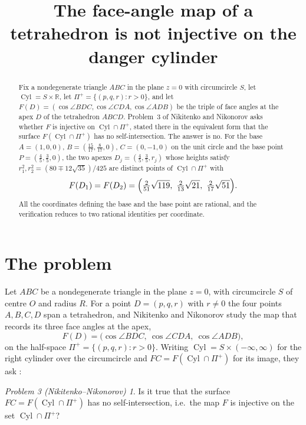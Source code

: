 \documentclass[11pt]{amsart}
\title[The face-angle map is not injective on the danger cylinder]
{The face-angle map of a tetrahedron is not injective on the danger cylinder}
\date{}
\theoremstyle{remark}
\newtheorem*{problem}{Problem 3 \textup{(Nikitenko--Nikonorov)}}
\DeclareMathOperator{\Cyl}{Cyl}
\begin{document}
\begin{abstract}
Fix a nondegenerate triangle $ABC$ in the plane $z=0$ with circumcircle $S$, let
$\Cyl=S\times\mathbb R$, let $\Pi^{+}=\{(p,q,r):r>0\}$, and let
$F(D)=(\cos\angle BDC,\cos\angle CDA,\cos\angle ADB)$ be the triple of face angles at the
apex $D$ of the tetrahedron $ABCD$. Problem~3 of Nikitenko and Nikonorov asks whether $F$
is injective on $\Cyl\cap\Pi^{+}$, stated there in the equivalent form that the surface
$F(\Cyl\cap\Pi^{+})$ has no self-intersection. The answer is no. For the base
$A=(1,0,0)$, $B=(\tfrac{15}{17},\tfrac{8}{17},0)$, $C=(0,-1,0)$ on the unit circle and the
base point $P=(\tfrac45,\tfrac35,0)$, the two apexes $D_j=(\tfrac45,\tfrac35,r_j)$ whose
heights satisfy $r_1^2,r_2^2=(80\mp12\sqrt{35})/425$ are distinct points of
$\Cyl\cap\Pi^{+}$ with
\[
 F(D_1)=F(D_2)=\Bigl(\tfrac{2}{51}\sqrt{119},\ \tfrac{2}{13}\sqrt{21},\
 \tfrac{2}{17}\sqrt{51}\Bigr).
\]
All the coordinates defining the base and the base point are rational, and the
verification reduces to two rational identities per coordinate.
\end{abstract}

\maketitle

\section{The problem}

Let $ABC$ be a nondegenerate triangle in the plane $z=0$, with circumcircle $S$ of centre
$O$ and radius $R$. For a point $D=(p,q,r)$ with $r\neq0$ the four points $A,B,C,D$ span a
tetrahedron, and Nikitenko and Nikonorov \cite{NN} study the map that records its three
face angles at the apex,
\begin{equation}\label{eq:F}
 F(D)=\bigl(\cos\angle BDC,\ \cos\angle CDA,\ \cos\angle ADB\bigr),
\end{equation}
on the half-space $\Pi^{+}=\{(p,q,r):r>0\}$. Writing $\Cyl=S\times(-\infty,\infty)$ for the
right cylinder over the circumcircle and $FC=F(\Cyl\cap\Pi^{+})$ for its image, they ask
\cite[Problem~3]{NN}:

\begin{problem}
\sloppy
Is it true that the surface $FC=F(\Cyl\cap\Pi^{+})$ has no self-intersection, i.e.\ the map
$F$ is injective on the set $\Cyl\cap\Pi^{+}$?
\end{problem}
\end{document}
